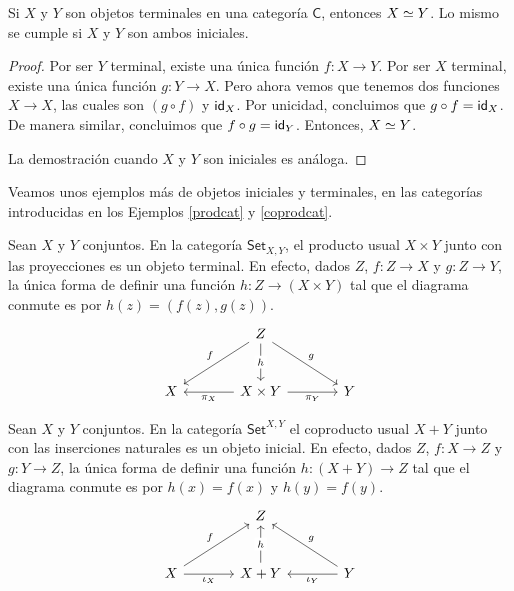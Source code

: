 \documentclass[../main.tex]{subfiles}
\begin{document}
\begin{theoremap}
    Si $X$ y $Y$ son objetos terminales en una categor\'ia $\mathsf{C}$, entonces $\eqv{X}{Y}$. Lo mismo se cumple si $X$ y $Y$ son ambos iniciales.
\end{theoremap}
\begin{proof}
    Por ser $Y$ terminal, existe una \'unica funci\'on $f: X \to Y$. Por ser $X$ terminal, existe una \'unica funci\'on $g: Y \to X$. Pero ahora vemos que tenemos dos funciones $X \to X$, las cuales son $(g\circ f)$ y $\idfunc[X]$. Por unicidad, concluimos que $g\circ f = \idfunc[X]$. De manera similar, concluimos que $f \circ g = \idfunc[Y]$. Entonces, $\eqv{X}{Y}$.

    La demostraci\'on cuando $X$ y $Y$ son iniciales es an\'aloga.
\end{proof}

Veamos unos ejemplos m\'as de objetos iniciales y terminales, en las categor\'ias introducidas en los Ejemplos \ref{prodcat} y \ref{coprodcat}.

\begin{exampleap}
    Sean $X$ y $Y$ conjuntos. En la categor\'ia $\mathsf{Set}_{X,Y}$, el producto usual $X \times Y$ junto con las proyecciones es un objeto terminal.
    En efecto, dados $Z$, $f:Z \to X$ y $g:Z\to Y$, la \'unica forma de definir una funci\'on $h:Z \to (X \times Y)$ tal que el diagrama conmute es por $h(z)=(f(z),g(z))$.
    \[\begin{tikzcd}[row sep=large,column sep=large]
            & Z \\
            X & {X \times Y} & Y
            \arrow["f"', from=1-2, to=2-1]
            \arrow["{\pi_X}", from=2-2, to=2-1]
            \arrow["g", from=1-2, to=2-3]
            \arrow["{\pi_Y}"', from=2-2, to=2-3]
            \arrow["h"{description}, from=1-2, to=2-2]
        \end{tikzcd}\]
\end{exampleap}

\begin{exampleap}
    Sean $X$ y $Y$ conjuntos. En la categor\'ia $\mathsf{Set}^{X,Y}$ el coproducto usual $X + Y$ junto con las inserciones naturales es un objeto inicial.
    En efecto, dados $Z$, $f:X \to Z$ y $g:Y\to Z$, la \'unica forma de definir una funci\'on $h: (X + Y) \to Z$ tal que el diagrama conmute es por $h(x)=f(x)$ y $h(y)=f(y)$.
    \[\begin{tikzcd}[row sep=large,column sep=large]
            & Z \\
            X & {X+Y} & Y
            \arrow["f", from=2-1, to=1-2]
            \arrow["{\iota_X}"', from=2-1, to=2-2]
            \arrow["g"', from=2-3, to=1-2]
            \arrow["\iota_Y", from=2-3, to=2-2]
            \arrow["h"{description}, from=2-2, to=1-2]
        \end{tikzcd}\]
\end{exampleap}
\end{document}
